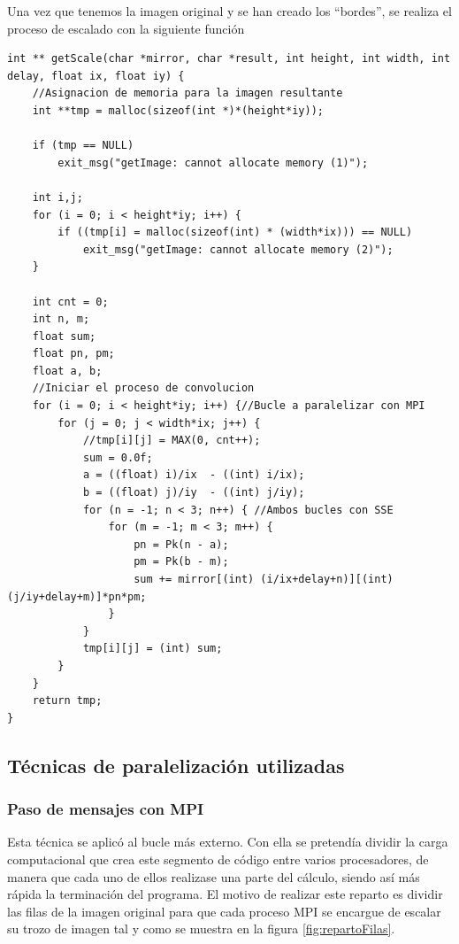 \documentclass{article}
\begin{document}
Una vez que tenemos la imagen original y se han creado los ``bordes'', se realiza el proceso de escalado con la siguiente función

\begin{lstlisting}[style=C]
int ** getScale(char *mirror, char *result, int height, int width, int delay, float ix, float iy) {
	//Asignacion de memoria para la imagen resultante
	int **tmp = malloc(sizeof(int *)*(height*iy));
	
	if (tmp == NULL)
		exit_msg("getImage: cannot allocate memory (1)");
	
	int i,j;
	for (i = 0; i < height*iy; i++) {
		if ((tmp[i] = malloc(sizeof(int) * (width*ix))) == NULL)
			exit_msg("getImage: cannot allocate memory (2)");
	}

	int cnt = 0;
	int n, m;
	float sum;
	float pn, pm;
	float a, b;
	//Iniciar el proceso de convolucion
	for (i = 0; i < height*iy; i++) {//Bucle a paralelizar con MPI
		for (j = 0; j < width*ix; j++) {
			//tmp[i][j] = MAX(0, cnt++);
			sum = 0.0f;
			a = ((float) i)/ix  - ((int) i/ix);
			b = ((float) j)/iy  - ((int) j/iy);
			for (n = -1; n < 3; n++) { //Ambos bucles con SSE
				for (m = -1; m < 3; m++) {
					pn = Pk(n - a);
					pm = Pk(b - m);
					sum += mirror[(int) (i/ix+delay+n)][(int) (j/iy+delay+m)]*pn*pm;
				}
			}
			tmp[i][j] = (int) sum;	
		}
	}
	return tmp;
}
\end{lstlisting}

\subsection{Técnicas de paralelización utilizadas}
\subsubsection{Paso de mensajes con MPI}
Esta técnica se aplicó al bucle más externo. Con ella se pretendía dividir la carga computacional que crea este segmento de código entre varios procesadores, de manera que cada uno de ellos realizase una parte del cálculo, siendo así más rápida la terminación del programa. El motivo de realizar este reparto es dividir las filas de la imagen original para que cada proceso MPI se encargue de escalar su trozo de imagen tal y como se muestra en la figura \ref{fig:repartoFilas}\cite{MPICH2, OpenMPI}.
\end{document}
